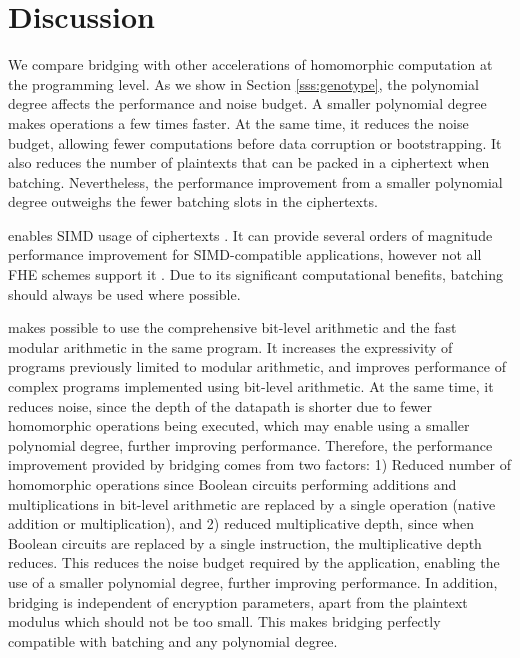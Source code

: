 \section{Discussion}\label{s:related_work}

We compare bridging with other accelerations of homomorphic computation at the programming level.
As we show in Section \ref{sss:genotype}, the polynomial degree affects the performance and noise budget. A smaller polynomial degree makes operations a few times faster. At the same time, it reduces the noise budget, allowing fewer computations before data corruption or bootstrapping. It also reduces the number of plaintexts that can be packed in a ciphertext when batching. Nevertheless, the performance improvement from a smaller polynomial degree outweighs the fewer batching slots in the ciphertexts.

 enables SIMD usage of ciphertexts \cite{batching}. It can provide several orders of magnitude performance improvement for SIMD-compatible applications, however not all FHE schemes support it \cite{chillotti2016faster,ducas2015fhew}. Due to its significant computational benefits, batching should always be used where possible. \iffalse if the target application is compatible with it. \fi


 makes possible to use the comprehensive bit-level arithmetic and the fast modular arithmetic in the same program. It increases the expressivity of programs previously limited to modular arithmetic, and improves performance of complex programs implemented using bit-level arithmetic. At the same time, it reduces noise, since the depth of the datapath is shorter due to fewer homomorphic operations being executed, which may enable using a smaller polynomial degree, further improving performance.
Therefore, the performance improvement provided by bridging comes from two factors: 1) Reduced number of homomorphic operations since Boolean circuits performing additions and multiplications in bit-level arithmetic are replaced by a single operation (native addition or multiplication), and 2) reduced multiplicative depth, since when Boolean circuits are replaced by a single instruction, the multiplicative depth reduces. This reduces the noise budget required by the application, enabling the use of a smaller polynomial degree, further improving performance.
In addition, bridging is independent of encryption parameters, apart from the plaintext modulus which should not be too small. This makes bridging perfectly compatible with batching and any polynomial degree.

